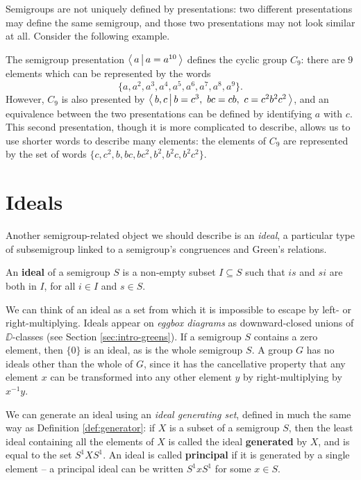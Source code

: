 Semigroups are not uniquely defined by presentations: two different
presentations may define the same semigroup, and those two presentations may not
look similar at all.  Consider the following example.

\begin{example}
  \label{ex:first-pres}
  The semigroup presentation $\left\langle \, a \, \middle| \, a=a^{10} \, \right\rangle$ defines the cyclic group
  $C_9$: there are $9$ elements which can be represented by the words
  $$\{a, a^2, a^3, a^4, a^5, a^6, a^7, a^8, a^9\}.$$  However, $C_9$ is also
  presented by $\pres{b,c}{b=c^3,\ bc=cb,\ c=c^2b^2c^2}$, and an equivalence
  between the two presentations can be defined by identifying $a$ with $c$.
  This second presentation, though it is more complicated to describe, allows us
  to use shorter words to describe many elements: the elements of $C_9$ are
  represented by the set of words $\{c, c^2, b, bc, bc^2, b^2, b^2c, b^2c^2\}$.
\end{example}

\section{Ideals}
\label{sec:intro-ideals}

Another semigroup-related object we should describe is an \textit{ideal}, a
particular type of subsemigroup linked to a semigroup's congruences and Green's
relations.

\begin{definition}
  \label{def:ideal}
  An \textbf{ideal} of a semigroup $S$ is a non-empty subset $I \subseteq S$ such that
  $is$ and $si$ are both in $I$, for all $i \in I$ and $s \in S$.
\end{definition}

We can think of an ideal as a set from which it is impossible to escape by left-
or right-multiplying.  Ideals appear on \textit{eggbox diagrams} as
downward-closed unions of $\DD$-classes (see Section \ref{sec:intro-greens}).
If a semigroup $S$ contains a zero element, then $\{0\}$ is an ideal, as is the
whole semigroup $S$.  A group $G$ has no ideals other than the whole of $G$,
since it has the cancellative property that any element $x$ can be transformed
into any other element $y$ by right-multiplying by $x^{-1}y$.

We can generate an ideal using an \textit{ideal generating set}, defined in much
the same way as Definition \ref{def:generator}: if $X$ is a subset of a
semigroup $S$, then the least ideal containing all the elements of $X$ is called
the ideal \textbf{generated} by $X$, and is equal to the set $S^1XS^1$.  An
ideal is called \textbf{principal} if it is generated by a single element -- a
principal ideal can be written $S^1xS^1$ for some $x \in S$.

